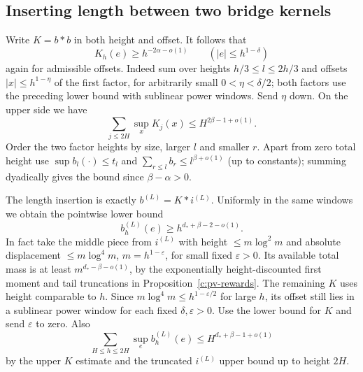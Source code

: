\documentclass[11pt]{article}
\numberwithin{equation}{section}
\theoremstyle{definition}\newtheorem{definition}[theorem]{Definition}
\theoremstyle{remark}\newtheorem{remark}[theorem]{Remark}
\begin{document}
\subsection{Inserting length between two bridge kernels}
Write \(K=b*b\) in both height and offset. It follows that
\[
 K_h(e)\ge h^{-2\alpha-o(1)} \qquad (|e|\le h^{1-\delta})
\]
again for admissible offsets. Indeed sum over heights \(h/3\le l\le 2h/3\) and offsets \(|x|\le h^{1-\eta}\) of the first factor, for arbitrarily small \(0<\eta<\delta/2\); both factors use the preceding lower bound with sublinear power windows. Send \(\eta\) down. On the upper side we have
\[
 \sum_{j\le 2H}\sup_x K_j(x)\le H^{2\beta-1+o(1)} .
\]
Order the two factor heights by size, larger \(l\) and smaller \(r\). Apart from zero total height use \(\sup b_l(\cdot)\le t_l\) and \(\sum_{r\le l} b_r\le l^{\beta+o(1)}\) (up to constants); summing dyadically gives the bound since \(\beta-\alpha>0\).

The length insertion is exactly \(b^{(L)}=K*i^{(L)}\). Uniformly in the same windows we obtain the pointwise lower bound
\[
 b_h^{(L)}(e)\ge h^{d_*+\beta-2-o(1)}.
\]
In fact take the middle piece from \(i^{(L)}\) with height \(\le m\log^2 m\) and absolute displacement \(\le m\log^4 m\), \(m=h^{1-\varepsilon}\), for small fixed \(\varepsilon>0\). Its available total mass is at least \(m^{d_*-\beta-o(1)}\), by the exponentially height-discounted first moment and tail truncations in Proposition~\ref{c:pv-rewards}. The remaining \(K\) uses height comparable to \(h\). Since \(m\log^4m\le h^{1-\varepsilon/2}\) for large \(h\), its offset still lies in a sublinear power window for each fixed \(\delta,\varepsilon>0\). Use the lower bound for \(K\) and send \(\varepsilon\) to zero. Also
\[
 \sum_{H\le h\le 2H}\sup_e b_h^{(L)}(e)\le H^{d_*+\beta-1+o(1)}
\]
by the upper \(K\) estimate and the truncated \(i^{(L)}\) upper bound up to height \(2H\).
\end{document}

